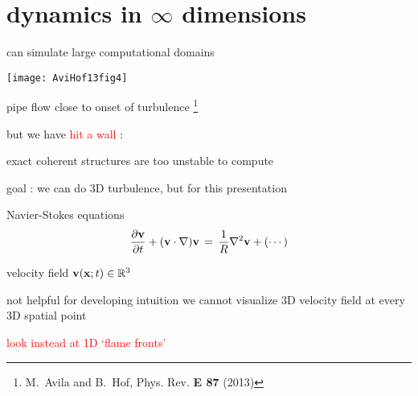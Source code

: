 %
%
%
%
%
%
%
%

\section[dynamics in $\infty$ dimensions]
{dynamics in $\infty$ dimensions}

\begin{frame}{can simulate {\Huge large} computational domains}
\begin{center}
\texttt{[image: AviHof13fig4]}
\end{center}
pipe flow close to onset of turbulence
\footnote{M.~Avila and B.~Hof, {Phys. Rev. \bf E 87} (2013)}

\bigskip

but we have \textcolor{red}{\Huge hit a wall} :

\hfill exact coherent structures are too unstable to compute
\end{frame}

\begin{frame}{goal : we can do 3D turbulence, but for this presentation}
\begin{block}{Navier-Stokes equations} %
\[
\dfrac{\partial {\bf v}}{\partial t} + ({\bf v} \cdot \nabla) {\bf v}
	\,=\,
\frac{1}{R} \nabla ^2 {\bf v} + (\cdots)
\]
\end{block}

\hfill{\small velocity field  ${\bf v}({\bf x};t) \in \mathbb{R}^3$}

\medskip

\begin{block}{not helpful for developing intuition}
we cannot visualize 3D velocity field at every 3D spatial point
\end{block}

\bigskip

\hfill {\Large\textcolor{red}{look instead at 1D `flame fronts'}}
\end{frame}

